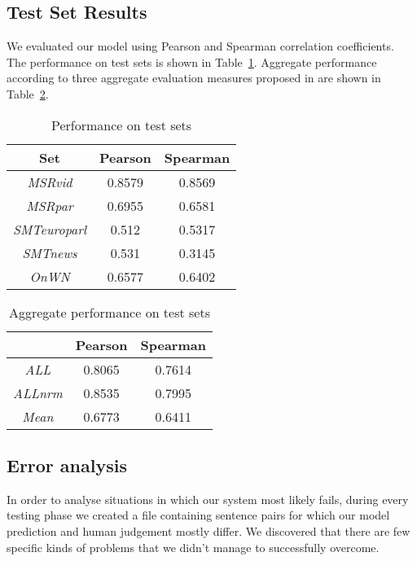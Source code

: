 \documentclass[10pt, a4paper]{article}
\begin{document}
\subsection{Test Set Results}

We evaluated our model using Pearson and Spearman correlation coefficients. The performance on test sets is shown in Table~\ref{tab:test-results-table}. Aggregate performance according to three aggregate evaluation measures proposed in \citep{agirre2012semeval} are shown in Table~\ref{tab:all-results-table}.

\begin{table}[h]
\caption{Performance on test sets}
\label{tab:test-results-table}
\begin{center}
\begin{tabular}{ccc}
\toprule
Set & Pearson & Spearman \\
\midrule
\textit{MSRvid} & 0.8579 & 0.8569 \\
\textit{MSRpar} & 0.6955 & 0.6581 \\
\textit{SMTeuroparl} & 0.512 & 0.5317 \\
\textit{SMTnews} & 0.531 & 0.3145 \\
\textit{OnWN} & 0.6577 & 0.6402 \\
\bottomrule
\end{tabular}
\end{center}
\end{table}

\begin{table}[h]
\caption{Aggregate performance on test sets}
\label{tab:all-results-table}
\begin{center}
\begin{tabular}{ccc}
\toprule
& Pearson & Spearman \\
\midrule
\textit{ALL} & 0.8065 & 0.7614\\
\textit{ALLnrm} & 0.8535 & 0.7995 \\
\textit{Mean} & 0.6773 & 0.6411 \\
\bottomrule
\end{tabular}
\end{center}
\end{table}


\subsection{Error analysis}

In order to analyse situations in which our system most likely fails, during every testing phase we created a file containing sentence pairs for which our model prediction and human judgement mostly differ. We discovered that there are few specific kinds of problems that we didn't manage to successfully overcome.
\end{document}
